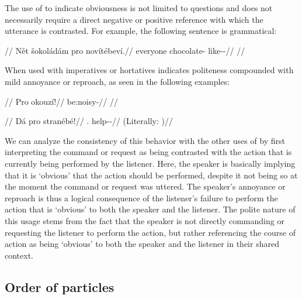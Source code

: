 The use of  to indicate obviousness is not limited to questions and
does not necessarily require a direct negative or positive reference with which
the utterance is contrasted. For example, the following sentence is grammatical:

\pex
\begingl
	\glpreamble {}//
	\gla Nět šokoládám pro novítébeví.//
	\glb everyone chocolate-\Agt{} \Cntr{} like-\Ben{}-\Cont{}//
	\glft {}//
\endgl
\xe

When used with imperatives or hortatives  indicates politeness
compounded with mild annoyance or reproach, as seen in the following examples:

\pex
\begingl
	\glpreamble {}//
	\gla Pro okouzí!//
	\glb \Cntr{} be:noisy-\N{}\Imp{}//
	\glft {}//
\endgl
\xe

\pex
\begingl
	\glpreamble {}//
	\gla Dá pro stranébé!//
	\glb \First.\Sg{} \Cntr{} help-\Ben{}-\Hort{}//
	\glft {} (Literally: )//
\endgl
\xe

We can analyze the consistency of this behavior with the other uses of 
by first interpreting the command or request as being contrasted with the action
that is currently being performed by the listener. Here, the speaker is
basically implying that it is `obvious' that the action should be performed,
despite it not being so at the moment the command or request was uttered. The
speaker's annoyance or reproach is thus a logical consequence of the listener's
failure to perform the action that is `obvious' to both the speaker and the
listener. The polite nature of this usage stems from the fact that the speaker
is not directly commanding or requesting the listener to perform the action, but
rather referencing the course of action as being `obvious' to both the speaker
and the listener in their shared context.

\subsection{Order of particles}\label{sec:order-of-particles}

